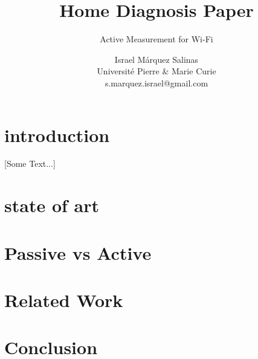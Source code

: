 \documentclass[sigconf]{Template}
\begin{document}
\title{Home Diagnosis Paper}
\subtitle{Active Measurement for Wi-Fi}
\author{Israel M\'{a}rquez Salinas \\Universit\'{e} Pierre \& Marie Curie \\s.marquez.israel@gmail.com}
\maketitle

\begin{abstract}
	
\end{abstract}

\section{introduction}\label{Introduction}

[Some Text...]

\section{state of art}\label{State of Art}

\section{Passive vs Active}\label{Passive vs Active}

\section{Related Work}\label{Related Work}

\section{Conclusion}\label{Conclusion}



\end{document}
